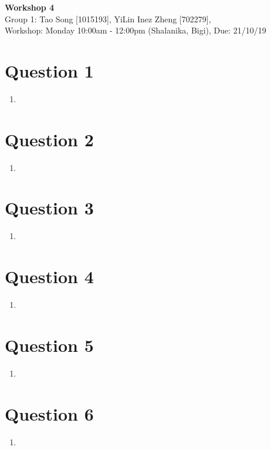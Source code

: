 \documentclass[11pt]{article}
\begin{document}
\begin{center}
\textbf{\Large{Workshop 4}}\\
Group 1: Tao Song [1015193], YiLin Inez Zheng [702279], \\
Workshop: Monday 10:00am - 12:00pm (Shalanika, Bigi), Due: 21/10/19  
\end{center}


\section*{Question 1}
\begin{enumerate}[label=(\alph*)]
\item 

\end{enumerate}


\section*{Question 2}
\begin{enumerate}[label=(\alph*)]
\item 

\end{enumerate}


\section*{Question 3}
\begin{enumerate}[label=(\alph*)]
\item 

\end{enumerate}

\section*{Question 4}
\begin{enumerate}[label=(\alph*)]
\item 

\end{enumerate}

\section*{Question 5}
\begin{enumerate}[label=(\alph*)]
\item 

\end{enumerate}

\section*{Question 6}
\begin{enumerate}[label=(\alph*)]
\item 

\end{enumerate}
\end{document}
